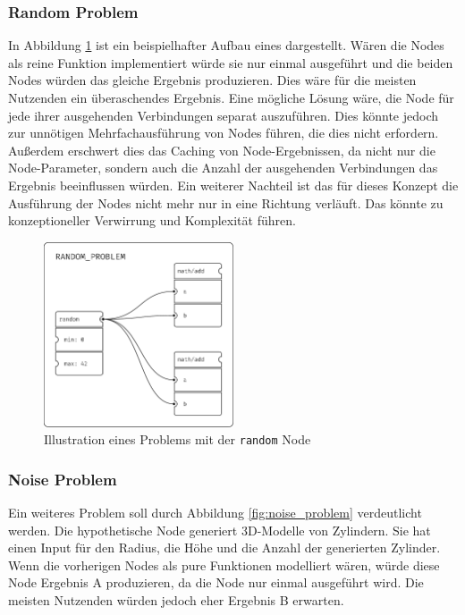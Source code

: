 \documentclass[ngerman]{article}
\begin{document}
\subsubsection*{Random Problem}
In Abbildung \ref{fig:random_problem} ist ein beispielhafter Aufbau eines  dargestellt. Wären die  Nodes als reine Funktion implementiert würde sie nur einmal ausgeführt und die beiden  Nodes würden das gleiche Ergebnis produzieren. Dies wäre für die meisten Nutzenden ein überaschendes Ergebnis.
\br
Eine mögliche Lösung wäre, die  Node für jede ihrer ausgehenden Verbindungen separat auszuführen. 
Dies könnte jedoch zur unnötigen Mehrfachausführung von Nodes führen, die dies nicht erfordern.
Außerdem erschwert dies das Caching von Node-Ergebnissen, da nicht nur die Node-Parameter, sondern auch die Anzahl der ausgehenden Verbindungen das Ergebnis beeinflussen würden.
\br
Ein weiterer Nachteil ist das für dieses Konzept die Ausführung der Nodes nicht mehr nur in eine Richtung verläuft. Das könnte zu konzeptioneller Verwirrung und Komplexität führen.
\br
\begin{figure}[htbp]
  \centering
  \includegraphics[width=0.5\textwidth]{graphics/RANDOM_PROBLEM.pdf}
  \caption{Illustration eines Problems mit der \texttt{random} Node}
  \label{fig:random_problem}
\end{figure}

\pagebreak

\subsubsection*{Noise Problem}

Ein weiteres Problem soll durch Abbildung \ref{fig:noise_problem} verdeutlicht werden. 
Die hypothetische  Node generiert 3D-Modelle von Zylindern. Sie hat einen Input für den Radius, die Höhe und die Anzahl der generierten Zylinder. 
\br
Wenn die vorherigen Nodes als pure Funktionen modelliert wären, würde diese Node Ergebnis A produzieren, da die  Node nur einmal ausgeführt wird. Die meisten Nutzenden würden jedoch eher Ergebnis B erwarten.
\end{document}
